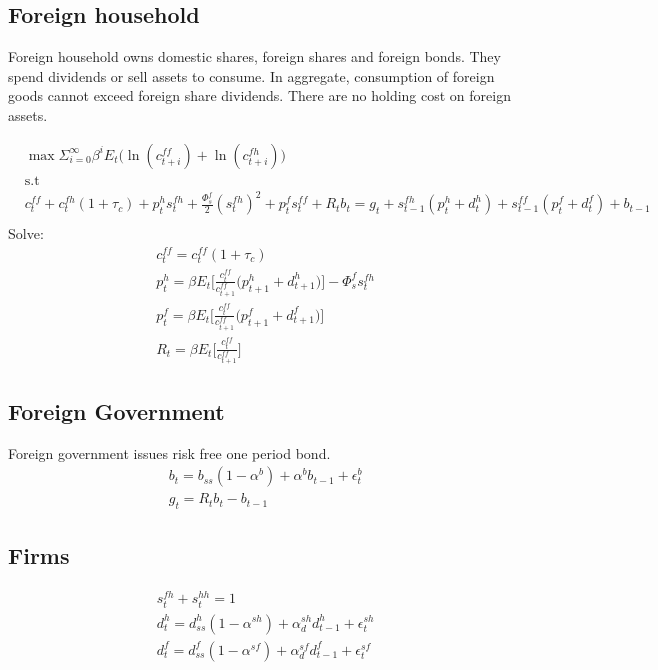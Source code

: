 \documentclass[a4paper]{article}
\begin{document}
\subsection{Foreign household}
Foreign household owns domestic shares, foreign shares and foreign bonds. They spend dividends or sell assets to consume. In aggregate, consumption of foreign goods cannot exceed foreign share dividends. There are no holding cost on foreign assets. 

\begin{align*}
&\max \Sigma_{i=0}^\infty \beta^i E_t \bigg(\ln(c^{ff}_{t+i})+ \ln(c^{fh}_{t+i}) \bigg)\\ &\text{s.t}\\
&c^{ff}_t+c^{fh}_t(1+\tau_c)+ p^{h}_t s^{fh}_t+\frac{\Phi^f_s}{2}(s^{fh}_t)^2 + p^{f}_t s^{ff}_t+ R_t b_t=g_t+s^{fh}_{t-1}(p^{h}_t+d^{h}_t)+s^{ff}_{t-1}(p^{f}_t+d^{f}_t)+b_{t-1}\\
\end{align*}
Solve:
\begin{align}
&c^{ff}_t=c^{ff}_t(1+\tau_c)\\
&p^{h}_t=\beta E_t \bigg[\frac{c^{ff}_t}{c^{ff}_{t+1}} \bigg(  p^{h}_{t+1}+d^{h}_{t+1} \bigg) \bigg] - \Phi^{f}_s s^{fh}_t\\
&p^{f}_t=\beta E_t \bigg[\frac{c^{ff}_t}{c^{ff}_{t+1}} \bigg(  p^{f}_{t+1}+d^{f}_{t+1} \bigg) \bigg]\\
&R_t=\beta E_t \bigg[\frac{c^{ff}_t}{c^{ff}_{t+1}} \bigg] 
\end{align}













\subsection{Foreign Government}
Foreign government issues risk free one period bond.
\begin{align}
&b_{t} = b_{ss}(1-\alpha^b) + \alpha^b b_{t-1} + \epsilon^b_t\\
&g_t	   = R_t b_{t}-b_{t-1}
\end{align}


\subsection{Firms}
\begin{align}
&s^{fh}_t+s^{hh}_t=1\\
&d^h_t=d^h_{ss} (1-\alpha^{sh}) +\alpha^{sh}_d d^h_{t-1} + \epsilon^{sh}_{t}\\
&d^f_t=d^f_{ss} (1-\alpha^{sf}) +\alpha^{sf}_d d^f_{t-1} + \epsilon^{sf}_{t}\\
\end{align}
\end{document}
